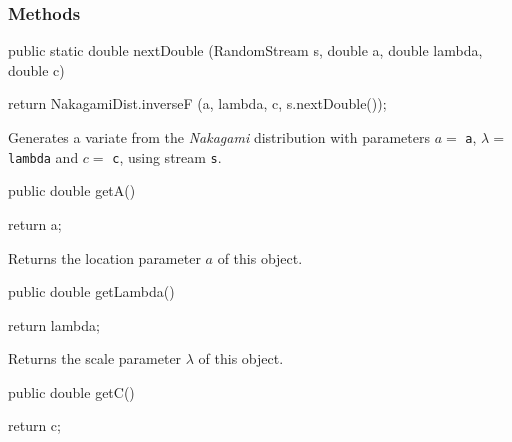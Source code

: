 \subsubsection* {Methods}
\begin{code}

   public static double nextDouble (RandomStream s, double a, double lambda,
                                    double c)\begin{hide} {
      return NakagamiDist.inverseF (a, lambda, c, s.nextDouble());
   }\end{hide}
\end{code}
\begin{tabb} Generates a variate from the {\em Nakagami\/} distribution with
 parameters $a=$ \texttt{a}, 
 $\lambda =$ \texttt{lambda} and $c =$ \texttt{c}, using stream \texttt{s}.
\end{tabb}
\begin{htmlonly}
\end{htmlonly}
\begin{code}

   public double getA()\begin{hide} {
      return a;
   }\end{hide}
\end{code}
  \begin{tabb} Returns the location parameter $a$ of this object.
  \end{tabb}
\begin{htmlonly}
\end{htmlonly}
\begin{code}

   public double getLambda()\begin{hide} {
      return lambda;
   }\end{hide}
\end{code}
  \begin{tabb} Returns the scale parameter $\lambda$ of this object.
  \end{tabb}
\begin{htmlonly}
\end{htmlonly}
\begin{code}

   public double getC()\begin{hide} {
      return c;
   }\end{hide}
\end{code}
